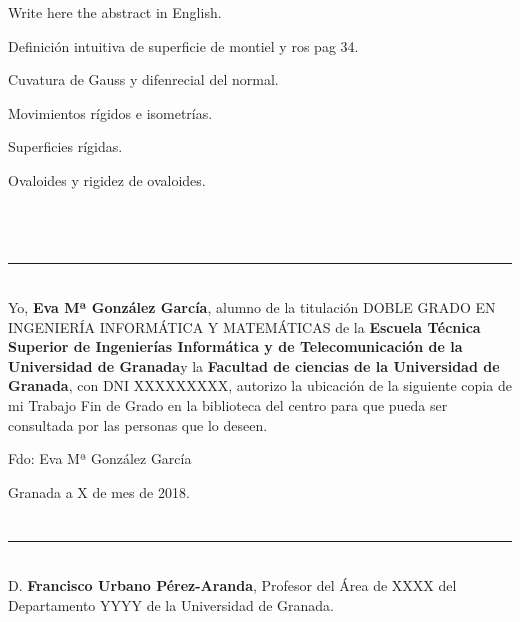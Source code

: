 Write here the abstract in English.

Definición intuitiva de superficie de montiel y ros pag 34.

Cuvatura de Gauss y difenrecial del normal.

Movimientos rígidos e isometrías.

Superficies rígidas.

Ovaloides y rigidez de ovaloides.

\vspace{0.7cm}
\\

\chapter*{}
\thispagestyle{empty}

\noindent\rule[-1ex]{\textwidth}{2pt}\\[4.5ex]

Yo, \textbf{Eva Mª González García}, alumno de la titulación DOBLE GRADO EN INGENIERÍA INFORMÁTICA Y MATEMÁTICAS de la \textbf{Escuela Técnica Superior
de Ingenierías Informática y de Telecomunicación de la Universidad de Granada}y la \textbf{Facultad de ciencias de la Universidad de Granada}, con DNI XXXXXXXXX, autorizo la
ubicación de la siguiente copia de mi Trabajo Fin de Grado en la biblioteca del centro para que pueda ser
consultada por las personas que lo deseen.

\vspace{6cm}

\noindent Fdo: Eva Mª González García

\vspace{2cm}

\begin{flushright}
Granada a X de mes de 2018.
\end{flushright}


\chapter*{}
\thispagestyle{empty}

\noindent\rule[-1ex]{\textwidth}{2pt}\\[4.5ex]

D. \textbf{Francisco Urbano Pérez-Aranda}, Profesor del Área de XXXX del Departamento YYYY de la Universidad de Granada.

\vspace{0.5cm}

